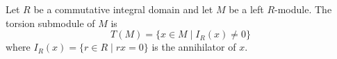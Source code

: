 Let $R$ be a commutative integral domain and let $M$ be a left $R$-module. The torsion submodule of $M$ is
$$T(M) = \{x \in M \mid I_R(x) \neq 0\}$$
where $I_R(x) = \{r \in R \mid rx = 0\}$ is the annihilator of $x$.
